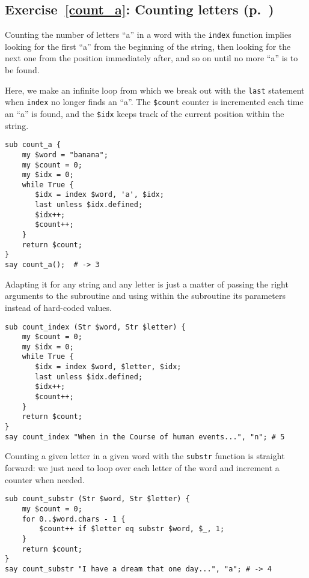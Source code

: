 \subsection{Exercise~\ref{count_a}: Counting letters (p.~\pageref{count_a})}
\label{sol_count_a}

Counting the number of letters ``a'' in a word with the {\tt index} 
function implies looking for the first ``a'' from the 
beginning of the string, then looking for the next one 
from the position immediately after, and so on until no 
more ``a'' is to be found.

Here, we make an infinite loop from which we break out with 
the {\tt last} statement when {\tt index} no longer finds 
an ``a''. The {\tt \$count} counter is incremented each time 
an ``a'' is found, and the {\tt \$idx} keeps track of the 
current position within the string.

\begin{verbatim}
sub count_a {
    my $word = "banana";
    my $count = 0;
    my $idx = 0;
    while True {
       $idx = index $word, 'a', $idx;
       last unless $idx.defined;
       $idx++;
       $count++;
    }
    return $count;
}
say count_a();  # -> 3
\end{verbatim}

Adapting it for any string and any letter is just a matter 
of passing the right arguments to the subroutine and using 
within the subroutine its parameters instead of hard-coded 
values.

\begin{verbatim}
sub count_index (Str $word, Str $letter) {
    my $count = 0;
    my $idx = 0;
    while True {
       $idx = index $word, $letter, $idx;
       last unless $idx.defined;
       $idx++;
       $count++;
    }
    return $count;
}
say count_index "When in the Course of human events...", "n"; # 5
\end{verbatim}

Counting a given letter in a given word with the {\tt substr} 
function is straight forward: we just need to loop over 
each letter of the word and increment a counter when needed.

\begin{verbatim}
sub count_substr (Str $word, Str $letter) {
    my $count = 0;
    for 0..$word.chars - 1 {
        $count++ if $letter eq substr $word, $_, 1;
    }
    return $count;
}
say count_substr "I have a dream that one day...", "a"; # -> 4
\end{verbatim}

